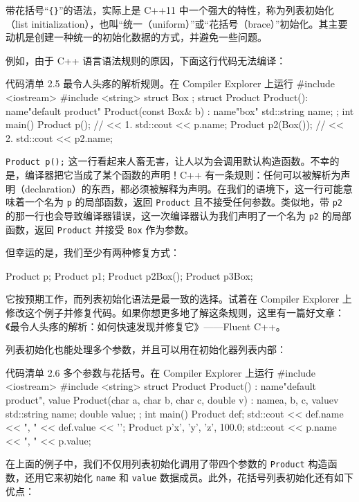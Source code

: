 带花括号“\texttt{\{\}}”的语法，实际上是 C++11 中一个强大的特性，称为列表初始化（list initialization），也叫“统一（uniform）”或“花括号（brace）”初始化。其主要动机是创建一种统一的初始化数据的方式，并避免一些问题。

例如，由于 C++ 语言语法规则的原因，下面这行代码无法编译：

\begin{codeboxt}[cpp]{代码清单 2.5 最令人头疼的解析规则。在 Compiler Explorer 上运行}
#include <iostream>
#include <string>
struct Box { };
struct Product {
Product(): name{"default product"} { }
Product(const Box& b) : name{"box"}{ }
std::string name;
};
int main() {
Product p();
// << 1.
std::cout << p.name;
Product p2(Box());
// << 2.
std::cout << p2.name;
}
\end{codeboxt}

\texttt{Product p();} 这一行看起来人畜无害，让人以为会调用默认构造函数。不幸的是，编译器把它当成了某个函数的声明！C++ 有一条规则：任何可以被解析为声明（declaration）的东西，都必须被解释为声明。在我们的语境下，这一行可能意味着一个名为 \texttt{p} 的局部函数，返回 \texttt{Product} 且不接受任何参数。类似地，带 \texttt{p2} 的那一行也会导致编译器错误，这一次编译器认为我们声明了一个名为 \texttt{p2} 的局部函数，返回 \texttt{Product} 并接受 \texttt{Box} 作为参数。

但幸运的是，我们至少有两种修复方式：

\begin{codebox}[cpp]
Product p{};
Product p1;
Product p2{Box()};
Product p3{Box{}};
\end{codebox}

它按预期工作，而列表初始化语法是最一致的选择。试着在 Compiler Explorer 上修改这个例子并修复代码。如果你想更多地了解这条规则，这里有一篇好文章：《最令人头疼的解析：如何快速发现并修复它》——Fluent C++。

列表初始化也能处理多个参数，并且可以用在初始化器列表内部：

\begin{codeboxt}[cpp]{代码清单 2.6 多个参数与花括号。在 Compiler Explorer 上运行}
#include <iostream>
#include <string>
struct Product {
Product() : name{"default product"}, value{} { }
Product(char a, char b, char c, double v)
: name{a, b, c}, value{v} { }
std::string name;
double value;
};
int main() {
Product def{};
std::cout << def.name << ", " << def.value << '\n';
Product p{'x', 'y', 'z', 100.0};
std::cout << p.name << ", " << p.value;
}
\end{codeboxt}

在上面的例子中，我们不仅用列表初始化调用了带四个参数的 \texttt{Product} 构造函数，还用它来初始化 \texttt{name} 和 \texttt{value} 数据成员。此外，花括号列表初始化还有如下优点：

